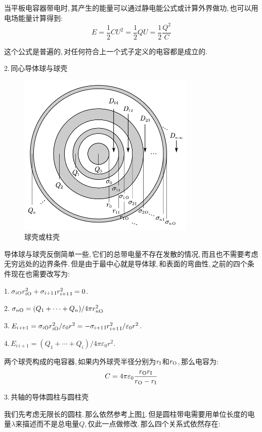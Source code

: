 当平板电容器带电时,\,其产生的能量可以通过静电能公式或计算外界做功,\,也可以用电场能量计算得到:
\[E=\frac{1}{2}CU^2=\frac{1}{2}QU=\frac{1}{2}\frac{Q^2}{C}\]

这个公式是普遍的,\,对任何符合上一个式子定义的电容都是成立的.

\npg{-2cm}
2.\,同心导体球与球壳

\begin{figure}
\vspace{0.5cm}
\centering
\includegraphics[width=8.5cm]{image/7-2-8.png}
\caption{球壳或柱壳}\label{fig7-2-8}
\end{figure}


导体球与球壳反倒简单一些,\,它们的总带电量不存在发散的情况,\,而且也不需要考虑无穷远处的边界条件.\,但是由于最中心就是导体球,\,和表面的弯曲性,\,之前的四个条件现在也需要改写为:

1.\,$\sigma_{i{\rm O}} r_{i{\rm O}}^2+\sigma_{i+1\,{\rm I}}r_{i+1\,{\rm I}}^2=0$.

2.\,$\sigma_{n{\rm O}}=(Q_1+\cdots+Q_n)/4\pi r_{n{\rm O}}^2$

3.\,$E_{i\,i+1}=\sigma_{i{\rm O}}r_{i{\rm O}}^2 /\varepsilon_0r^2=-\sigma_{i+1\,{\rm I}}r_{i+1\,{\rm I}}^2/\varepsilon_0r^2$.

4.\,$E_{i\,i+1}=(Q_1+\cdots+Q_i)/4\pi\varepsilon_0 r^2$.

两个球壳构成的电容器,\,如果内外球壳半径分别为$r_{\rm I}$和$r_{\rm O}$,\,那么电容为:
\[C=4\pi\varepsilon_0\frac{r_{\rm O}r_{\rm I}}{r_{\rm O}-r_{\rm I}}\]

\vspace{0.5cm}
3.\,共轴的导体圆柱与圆柱壳

我们先考虑无限长的圆柱.\,那么依然参考上图\ref{fig7-2-8}.\,但是圆柱带电需要用单位长度的电量$\lambda$来描述而不是总电量$Q$,\,仅此一点做修改.\,那么四个关系式依然存在:

